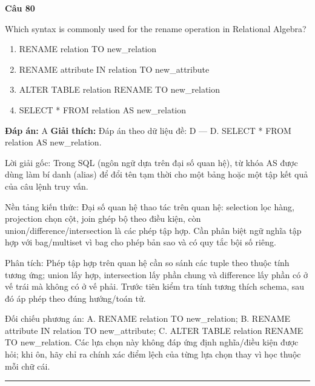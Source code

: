 \documentclass[11pt,a4paper]{article}
\newenvironment{question}[1]{%
  \par\vspace{1em}\noindent\textbf{\large Câu #1}\par\vspace{0.4em}
}{%
  \par\vspace{1em}\hrule\vspace{0.6em}
}
\newenvironment{choices}{%
  \begin{enumerate}[label=\textbf{\Alph*.},leftmargin=2.2em,itemsep=2pt,topsep=3pt]
}{%
  \end{enumerate}
}
\newcommand{\choice}{\item}
\begin{document}
\begin{question}{80}
Which syntax is commonly used for the rename operation in Relational Algebra?
\begin{choices}
\choice RENAME relation TO new_relation
\choice RENAME attribute IN relation TO new_attribute
\choice ALTER TABLE relation RENAME TO new_relation
\choice SELECT * FROM relation AS new_relation
\end{choices}
\textbf{Đáp án:} A
\textbf{Giải thích:} Đáp án theo dữ liệu đề: D — D. SELECT * FROM relation AS new_relation.

Lời giải gốc: Trong SQL (ngôn ngữ dựa trên đại số quan hệ), từ khóa AS được dùng làm bí danh (alias) để đổi tên tạm thời cho một bảng hoặc một tập kết quả của câu lệnh truy vấn.

Nền tảng kiến thức: Đại số quan hệ thao tác trên quan hệ: selection lọc hàng, projection chọn cột, join ghép bộ theo điều kiện, còn union/difference/intersection là các phép tập hợp. Cần phân biệt ngữ nghĩa tập hợp với bag/multiset vì bag cho phép bản sao và có quy tắc bội số riêng.

Phân tích: Phép tập hợp trên quan hệ cần so sánh các tuple theo thuộc tính tương ứng; union lấy hợp, intersection lấy phần chung và difference lấy phần có ở vế trái mà không có ở vế phải. Trước tiên kiểm tra tính tương thích schema, sau đó áp phép theo đúng hướng/toán tử.

Đối chiếu phương án: A. RENAME relation TO new_relation; B. RENAME attribute IN relation TO new_attribute; C. ALTER TABLE relation RENAME TO new_relation. Các lựa chọn này không đáp ứng định nghĩa/điều kiện được hỏi; khi ôn, hãy chỉ ra chính xác điểm lệch của từng lựa chọn thay vì học thuộc mỗi chữ cái.
\end{question}
\end{document}
